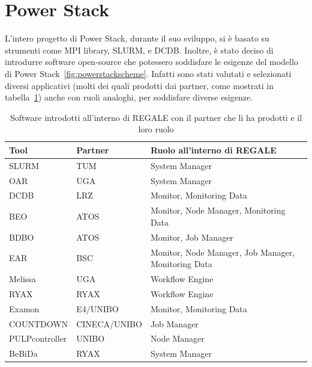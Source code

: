 \section{Power Stack}
L'intero progetto di Power Stack, durante il suo sviluppo, si è basato su strumenti come MPI library\cite{mpi}, SLURM\cite{slurm}, e DCDB\cite{dcdb}. Inoltre, è stato deciso di introdurre software open-source che potessero soddisfare le esigenze del modello di Power Stack~\ref{fig:powerstackscheme}. Infatti sono stati valutati e selezionati diversi applicativi (molti dei quali prodotti dai partner, come mostrati in tabella~\ref{table:REGALE}) anche con ruoli analoghi, per soddisfare diverse esigenze.
\begin{table}[ht]
    \centering
    \begin{tabular}{l|l|l}
    \hline
    \textbf{Tool} & \textbf{Partner} & \textbf{Ruolo all'interno di REGALE} \\
    \hline
    SLURM & TUM & System Manager \\
    \hline
    OAR & UGA & System Manager \\
    \hline
    DCDB & LRZ & Monitor, Monitoring Data \\
    \hline
    BEO & ATOS & Monitor, Node Manager, Monitoring Data \\
    \hline
    BDBO & ATOS & Monitor, Job Manager \\
    \hline
    EAR & BSC & Monitor, Node Manager, Job Manager, Monitoring Data \\
    \hline
    Melissa & UGA & Workflow Engine \\
    \hline
    RYAX & RYAX & Workflow Engine \\
    \hline
    Examon & E4/UNIBO & Monitor, Monitoring Data \\
    \hline
    COUNTDOWN & CINECA/UNIBO & Job Manager \\
    \hline
    PULPcontroller & UNIBO & Node Manager \\
    \hline
    BeBiDa & RYAX & System Manager \\
    \hline
\end{tabular}
\caption{Software introdotti all'interno di REGALE con il partner che li ha prodotti e il loro ruolo}\label{table:REGALE}
\end{table}

